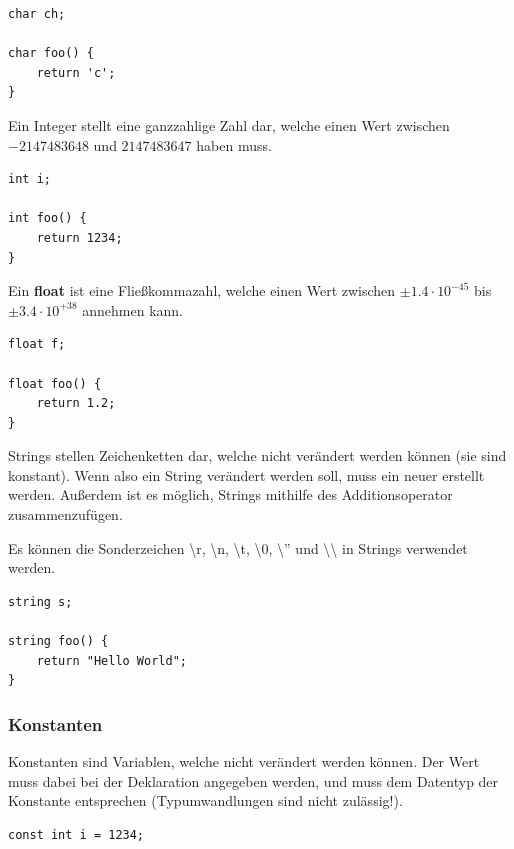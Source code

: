 \begin{lstlisting}[language=CMM]
char ch;

char foo() {
	return 'c';
}
\end{lstlisting}


Ein Integer stellt eine ganzzahlige Zahl dar, welche einen Wert zwischen $-2147483648$ und $2147483647$ haben muss.

\begin{lstlisting}[language=CMM]
int i;

int foo() {
	return 1234;
}
\end{lstlisting}


Ein \textbf{float} ist eine Fließkommazahl, welche einen Wert zwischen $\pm1.4 \cdot 10^{-45}$ bis $\pm3.4 \cdot 10^{+38}$ annehmen kann.

\begin{lstlisting}[language=CMM]
float f;

float foo() {
	return 1.2;
}
\end{lstlisting}


Strings stellen Zeichenketten dar, welche nicht verändert werden können (sie sind konstant). Wenn also ein String verändert werden soll, muss ein neuer erstellt werden. Au\ss{}erdem ist es möglich, Strings mithilfe des Additionsoperator zusammenzufügen.

Es k\"onnen die Sonderzeichen \textbackslash{}r, \textbackslash{}n, \textbackslash{}t, \textbackslash{}0, \textbackslash{}'' und \textbackslash{}\textbackslash{} in Strings verwendet werden.

\begin{lstlisting}[language=CMM]
string s;

string foo() {
	return "Hello World";
}
\end{lstlisting}

\subsubsection{Konstanten}

Konstanten sind Variablen, welche nicht ver\"andert werden k\"onnen. Der Wert muss dabei bei der Deklaration angegeben werden, und muss dem Datentyp der Konstante entsprechen (Typumwandlungen sind nicht zul\"assig!).

\begin{lstlisting}[language=CMM]
const int i = 1234;
\end{lstlisting}

